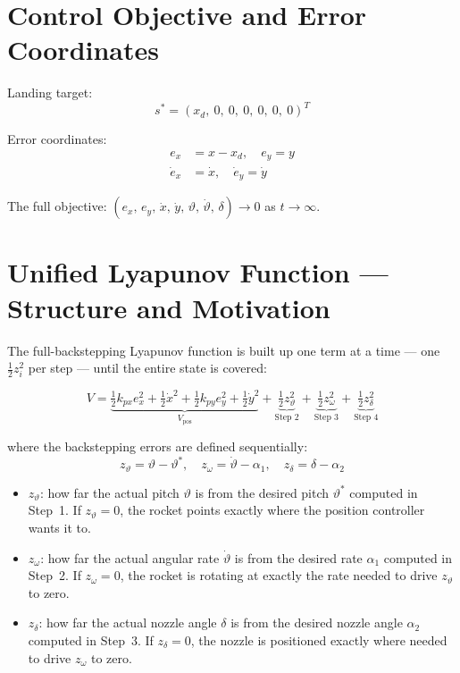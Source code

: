 \documentclass[11pt,a4paper]{article}
\theoremstyle{plain}
\theoremstyle{remark}
\newcommand{\vth}{\vartheta}
\newcommand{\vths}{\vartheta^*}
\newcommand{\zth}{z_{\vth}}
\newcommand{\zom}{z_{\omega}}
\newcommand{\zdel}{z_{\delta}}
\begin{document}
\section{Control Objective and Error Coordinates}

Landing target:
\[
  s^* = (x_d,\ 0,\ 0,\ 0,\ 0,\ 0,\ 0)^T
\]

Error coordinates:
\begin{align}
  e_x &= x - x_d, \quad e_y = y \\
  \dot e_x &= \dot x, \quad \dot e_y = \dot y
\end{align}

The full objective: $(e_x,\, e_y,\, \dot x,\, \dot y,\, \vth,\, \dot\vth,\, \delta) \to 0$ as $t \to \infty$.

\section{Unified Lyapunov Function --- Structure and Motivation}

The full-backstepping Lyapunov function is built up one term at a time --- one $\tfrac{1}{2}z_i^2$ per step --- until the entire state is covered:

\begin{equation}
  V = \underbrace{\tfrac{1}{2}k_{px}e_x^2 + \tfrac{1}{2}\dot x^2 + \tfrac{1}{2}k_{py}e_y^2 + \tfrac{1}{2}\dot y^2}_{V_{\mathrm{pos}}} + \underbrace{\tfrac{1}{2}\zth^2}_{\text{Step 2}} + \underbrace{\tfrac{1}{2}\zom^2}_{\text{Step 3}} + \underbrace{\tfrac{1}{2}\zdel^2}_{\text{Step 4}}
  \tag{V}
\end{equation}

where the backstepping errors are defined sequentially:
\[
  \zth = \vth - \vths, \quad \zom = \dot\vth - \alpha_1, \quad \zdel = \delta - \alpha_2
\]

\begin{itemize}
  \item $\zth$: how far the actual pitch $\vth$ is from the desired pitch $\vths$ computed in Step~1. If $\zth = 0$, the rocket points exactly where the position controller wants it to.
  \item $\zom$: how far the actual angular rate $\dot\vth$ is from the desired rate $\alpha_1$ computed in Step~2. If $\zom = 0$, the rocket is rotating at exactly the rate needed to drive $\zth$ to zero.
  \item $\zdel$: how far the actual nozzle angle $\delta$ is from the desired nozzle angle $\alpha_2$ computed in Step~3. If $\zdel = 0$, the nozzle is positioned exactly where needed to drive $\zom$ to zero.
\end{itemize}
\end{document}
